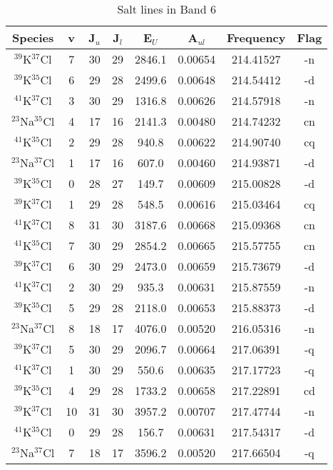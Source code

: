 \begin{table*}[htp]
\centering
\caption{Salt lines in Band 6}
\begin{tabular}{cccccccc}
\label{tab:all_detections_B6}
Species & v & J$_u$ & J$_l$ & E$_U$ & A$_{ul}$ & Frequency & Flag \\
\hline
$^{39}$K$^{37}$Cl & 7 & 30 & 29 & 2846.1 & 0.00654 & 214.41527 & -n \\
$^{39}$K$^{35}$Cl & 6 & 29 & 28 & 2499.6 & 0.00648 & 214.54412 & -d \\
$^{41}$K$^{37}$Cl & 3 & 30 & 29 & 1316.8 & 0.00626 & 214.57918 & -n \\
$^{23}$Na$^{35}$Cl & 4 & 17 & 16 & 2141.3 & 0.00480 & 214.74232 & cn \\
$^{41}$K$^{35}$Cl & 2 & 29 & 28 & 940.8 & 0.00622 & 214.90740 & cq \\
$^{23}$Na$^{37}$Cl & 1 & 17 & 16 & 607.0 & 0.00460 & 214.93871 & -d \\
$^{39}$K$^{35}$Cl & 0 & 28 & 27 & 149.7 & 0.00609 & 215.00828 & -d \\
$^{39}$K$^{37}$Cl & 1 & 29 & 28 & 548.5 & 0.00616 & 215.03464 & cq \\
$^{41}$K$^{37}$Cl & 8 & 31 & 30 & 3187.6 & 0.00668 & 215.09368 & cn \\
$^{41}$K$^{35}$Cl & 7 & 30 & 29 & 2854.2 & 0.00665 & 215.57755 & cn \\
$^{39}$K$^{37}$Cl & 6 & 30 & 29 & 2473.0 & 0.00659 & 215.73679 & -d \\
$^{41}$K$^{37}$Cl & 2 & 30 & 29 & 935.3 & 0.00631 & 215.87559 & -n \\
$^{39}$K$^{35}$Cl & 5 & 29 & 28 & 2118.0 & 0.00653 & 215.88373 & -d \\
$^{23}$Na$^{37}$Cl & 8 & 18 & 17 & 4076.0 & 0.00520 & 216.05316 & -n \\
$^{39}$K$^{37}$Cl & 5 & 30 & 29 & 2096.7 & 0.00664 & 217.06391 & -q \\
$^{41}$K$^{37}$Cl & 1 & 30 & 29 & 550.6 & 0.00635 & 217.17723 & -q \\
$^{39}$K$^{35}$Cl & 4 & 29 & 28 & 1733.2 & 0.00658 & 217.22891 & cd \\
$^{39}$K$^{37}$Cl & 10 & 31 & 30 & 3957.2 & 0.00707 & 217.47744 & -n \\
$^{41}$K$^{35}$Cl & 0 & 29 & 28 & 156.7 & 0.00631 & 217.54317 & -d \\
$^{23}$Na$^{37}$Cl & 7 & 18 & 17 & 3596.2 & 0.00520 & 217.66504 & -q \\

\end{tabular}
\end{table*}
